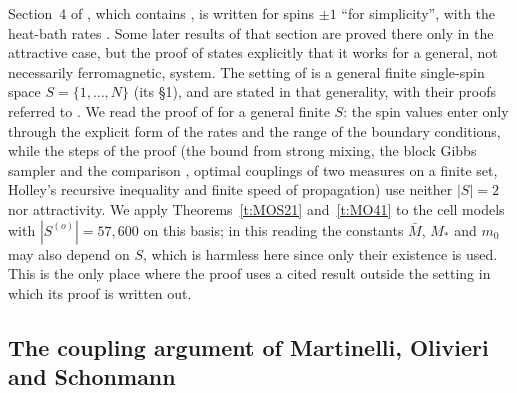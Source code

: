 \begin{remark}\label{r:finiteS}
Section~4 of \cite{MO94}, which contains \cite[Theorem~4.1]{MO94}, is written for spins $\pm 1$ ``for simplicity'', with the heat-bath rates \cite[(4.1)]{MO94}. Some later results of that section are proved there only in the attractive case, but the proof of \cite[Theorem~4.1]{MO94} states explicitly that it works for a general, not necessarily ferromagnetic, system. The setting of \cite{MOS94} is a general finite single-spin space $S = \{1, \dots, N\}$ (its \S 1), and \cite[Theorem~2.1 and Theorem~3.2, (ii)$\Rightarrow$(iv)]{MOS94} are stated in that generality, with their proofs referred to \cite[\S 4]{MO94}. We read the proof of \cite[Theorem~4.1]{MO94} for a general finite $S$: the spin values enter only through the explicit form of the rates \cite[(4.1)]{MO94} and the range of the boundary conditions, while the steps of the proof (the bound \cite[(4.2)]{MO94} from strong mixing, the block Gibbs sampler and the comparison \cite[(4.5)]{MO94}, optimal couplings of two measures on a finite set, Holley's recursive inequality and finite speed of propagation) use neither $|S| = 2$ nor attractivity. We apply Theorems~\ref{t:MOS21} and~\ref{t:MO41} to the cell models with $|S^{(o)}| = 57{, }600$ on this basis; in this reading the constants $\bar M$, $M_*$ and $m_0$ may also depend on $S$, which is harmless here since only their existence is used. This is the only place where the proof uses a cited result outside the setting in which its proof is written out.
\end{remark}

\subsection{The coupling argument of Martinelli, Olivieri and Schonmann}\label{s:surgery}

